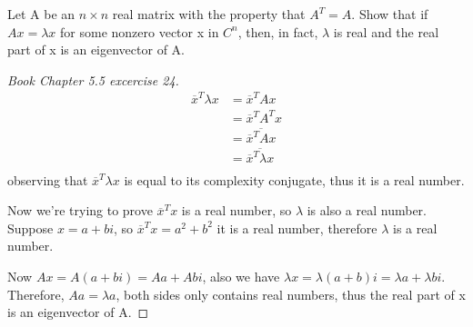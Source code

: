 \begin{problem}\label{ex: 5.5.24}
    Let A be an \(n \times n\) real matrix with the property that \(A^T = A\). Show that if \(Ax = \lambda x\) for some nonzero vector x in \(C^n\), then, in fact, \(\lambda\) is real and the real part of x is an eigenvector of A.    
\end{problem}
\begin{proof}[Book Chapter 5.5 excercise 24]
    \begin{align*}
        \overline{x}^T \lambda x &=  \overline{x}^T Ax \\
            &= \overline{x}^T A^T x \tag{A is symmetric}\\
            &= \overline{\overline{x}^T Ax} \tag{excercise 23}\\
            &= \overline{\overline{x}^T \lambda x}\\
    \end{align*}
    observing that \(\overline{x}^T \lambda x\) is equal to its complexity conjugate, thus it is a real number.

    Now we're trying to prove \(\overline{x}^T x\) is a real number, so \(\lambda\) is also a real number. \\ 
    Suppose \(x = a + b i\), so \(\overline{x}^T x = a^2 + b^2\) it is a real number, therefore \(\lambda\) is a real number. 
    
    Now \(Ax = A(a + bi) = Aa + Ab i\), also we have \(\lambda x = \lambda (a + b) i = \lambda a + \lambda b i\).\\  
    Therefore, \(Aa = \lambda a\), both sides only contains real numbers, thus the real part of x is an eigenvector of A.
\end{proof}